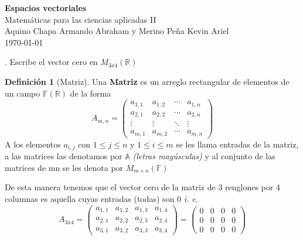 \documentclass[letterpaper]{article}
\newcommand{\F}{\mathds{F}}
\newcommand{\R}{\mathds{R}}
\renewcommand{\*}{\cdot}
\theoremstyle{definition}
\newtheorem{definition}{Definición}[section]
\begin{document}
		\begin{titlepage}
		\begin{center}
			\Large{\textbf{Espacios vectoriales}} \\[0.1cm]
			\huge{Matemáticas para las ciencias aplicadas II}\\[0.2cm]
			\large{Aquino Chapa Armando Abraham y Merino Peña Kevin Ariel }
			\\
			\today
		\end{center}
		\let\newpage\relax%
		\hrulefill
	\end{titlepage}

	
	. Escribe el vector cero en $M_{3x4}(\mathbb{R})$
		\begin{definition}[Matriz]
		Una \textbf{Matriz} es un arreglo rectangular de elementos de un campo $ \F(\R) $ de la forma
		\begin{equation*}
		A_{m,n} = 
		\begin{pmatrix}
		a_{1,1} & a_{1,2} & \cdots & a_{1,n} \\
		a_{2,1} & a_{2,2} & \cdots & a_{2,n} \\
		\vdots  & \vdots  & \ddots & \vdots  \\
		a_{m,1} & a_{m,2} & \cdots & a_{m,n} 
		\end{pmatrix}
		\end{equation*}
		A los elementos $ a_{i,j} $ con $ 1 \leq j \leq n $ y $ 1 \leq i \leq m $ se les llama entradas de la matriz, a las matrices las denotamos por $ \mathds{A} $ 				\textit{(letras mayúsculas)} y al conjunto de las matrices de mn se les denota por $ M_{m\times n}(\F) $
		
	\end{definition}
	De esta manera tenemos que el vector cero de la matriz de 3 renglones por 4 columnas es aquella cuyas entradas (todas) son 0 \textit{i. e. }
		\begin{equation*}
		A_{3x4} = 
		\begin{pmatrix}
		a_{1,1} & a_{1,2} & a_{1,3} & a_{1,4} \\
		a_{2,1} & a_{2,2} & a_{2,3} & a_{2,4} \\
		a_{3,1} & a_{3,2} & a_{3,3} & a_{3,4} 
		\end{pmatrix}
		= 
		\begin{pmatrix}
		0 & 0 & 0 & 0\\
		0 & 0 & 0 & 0 \\
		0 & 0 & 0 & 0
		\end{pmatrix}
		\end{equation*}
		
\end{document}
